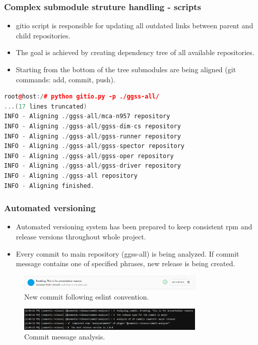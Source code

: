 \documentclass[10pt]{beamer}
\begin{document}
\begin{frame}[fragile]
\frametitle{Complex submodule struture handling - scripts}
\begin{itemize}
\item gitio script is responsible for updating all outdated links between parent and child repositories.
\item The goal is achieved by creating dependency tree of all available repositories.
\item Starting from the bottom of the tree submodules are being aligned (git commands: add, commit, push).
\end{itemize}
\begin{lstlisting}[language=c++, caption={Gitio in action.}]
root@host:/# python gitio.py -p ./ggss-all/
...(17 lines truncated)
INFO - Aligning ./ggss-all/mca-n957 repository
INFO - Aligning ./ggss-all/ggss-dim-cs repository
INFO - Aligning ./ggss-all/ggss-runner repository
INFO - Aligning ./ggss-all/ggss-spector repository
INFO - Aligning ./ggss-all/ggss-oper repository
INFO - Aligning ./ggss-all/ggss-driver repository
INFO - Aligning ./ggss-all repository
INFO - Aligning finished.
\end{lstlisting}
\end{frame}


\begin{frame}[fragile]
\frametitle{Automated versioning}
\begin{itemize}
\item Automated versioning system has been prepared to keep consistent rpm and release versions throughout whole project.
\item Every commit to main repository (ggss-all) is being analyzed. If commit message contains one of specified phrases, new release is being created.
\end{itemize}
\begin{figure}
    \centering
    \includegraphics[width=0.8\textwidth]{resources/commit.PNG}
    \caption{New commit following eslint convention.}
\end{figure}
\begin{figure}
    \centering
    \includegraphics[width=0.8\textwidth]{resources/commit_message_analyze.PNG}
    \caption{Commit message analysis.}
\end{figure}

\end{frame}
\end{document}
